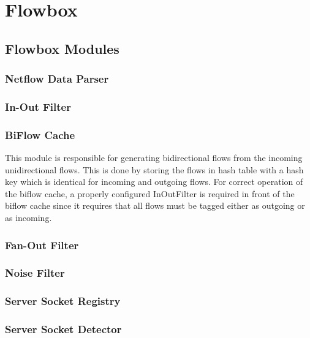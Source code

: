 
\chapter{Flowbox}


\section{Flowbox Modules}

\subsection{Netflow Data Parser}

\subsection{In-Out Filter}

\subsection{BiFlow Cache}
This module is responsible for generating bidirectional flows from the incoming unidirectional flows. This is done by storing the flows in hash table with a hash key which is identical for incoming and outgoing flows. For correct operation of the biflow cache, a properly configured InOutFilter is required in front of the biflow cache since it requires that all flows must be tagged either as outgoing or as incoming. 

\subsection{Fan-Out Filter}

\subsection{Noise Filter}


\subsection{Server Socket Registry}


\subsection{Server Socket Detector}

